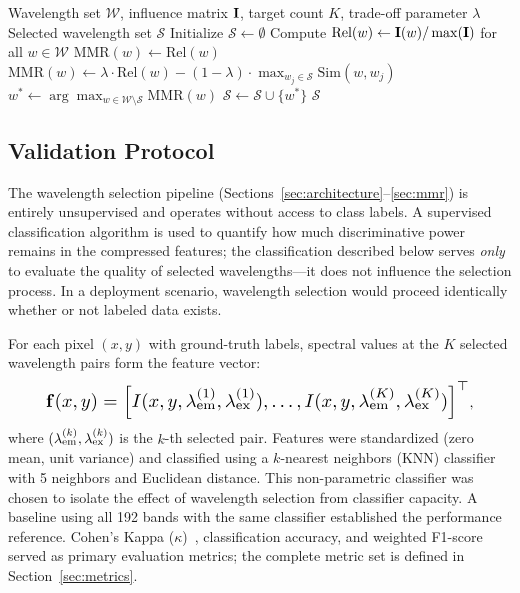 \begin{algorithm}[t]
\caption{MMR Wavelength Selection}
\label{alg:mmr}
\begin{algorithmic}[1]
\REQUIRE Wavelength set $\mathcal{W}$, influence matrix $\mathbf{I}$, target count $K$, trade-off parameter $\lambda$
\ENSURE Selected wavelength set $\mathcal{S}$
\STATE Initialize $\mathcal{S} \gets \emptyset$
\STATE Compute $\text{Rel}(w) \gets \mathbf{I}(w) / \max(\mathbf{I})$ for all $w \in \mathcal{W}$
            \STATE $\text{MMR}(w) \gets \text{Rel}(w)$
        \ELSE
            \STATE $\text{MMR}(w) \gets \lambda \cdot \text{Rel}(w) - (1-\lambda) \cdot \max_{w_j \in \mathcal{S}} \text{Sim}(w, w_j)$
        \ENDIF
    \ENDFOR
    \STATE $w^* \gets \arg\max_{w \in \mathcal{W} \setminus \mathcal{S}} \text{MMR}(w)$
    \STATE $\mathcal{S} \gets \mathcal{S} \cup \{w^*\}$
\ENDFOR
\RETURN $\mathcal{S}$
\end{algorithmic}
\end{algorithm}

\subsection{Validation Protocol}
\label{sec:validation}

The wavelength selection pipeline (Sections~\ref{sec:architecture}--\ref{sec:mmr}) is entirely unsupervised and operates without access to class labels.
A supervised classification algorithm is used to quantify how much discriminative power remains in the compressed features; the classification described below serves \emph{only} to evaluate the quality of selected wavelengths---it does not influence the selection process.
In a deployment scenario, wavelength selection would proceed identically whether or not labeled data exists.

For each pixel $(x, y)$ with ground-truth labels, spectral values at the $K$ selected wavelength pairs form the feature vector:
\begin{equation}
\resizebox{0.88\columnwidth}{!}{$
\vect{f}(x, y) = \left[ I(x, y, \lambda_{\mathrm{em}}^{(1)}, \lambda_{\mathrm{ex}}^{(1)}), \ldots, I(x, y, \lambda_{\mathrm{em}}^{(K)}, \lambda_{\mathrm{ex}}^{(K)}) \right]^\top$},
\label{eq:features}
\end{equation}
where $(\lambda_{\text{em}}^{(k)}, \lambda_{\text{ex}}^{(k)})$ is the $k$-th selected pair.
Features were standardized (zero mean, unit variance) and classified using a $k$-nearest neighbors (KNN) classifier~\cite{cover1967nearest} with 5 neighbors and Euclidean distance.
This non-parametric classifier was chosen to isolate the effect of wavelength selection from classifier capacity.
A baseline using all 192 bands with the same classifier established the performance reference.
Cohen's Kappa ($\kappa$)~\cite{cohen1960coefficient}, classification accuracy, and weighted F1-score served as primary evaluation metrics; the complete metric set is defined in Section~\ref{sec:metrics}.
